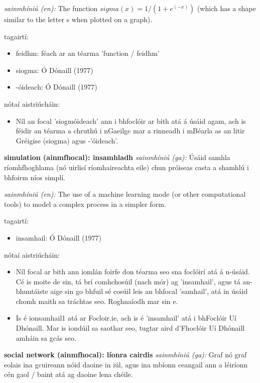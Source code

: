 \documentclass{article}
\begin{document}
\textit{sainmhíniú (en):} The function $sigma(x) = 1 / (1 + e^(-x))$ (which has a shape similar to the letter s when plotted on a graph).

tagairtí:
\begin{itemize}
	\item feidhm: féach ar an téarma 'function / feidhm'
	\item siogma: Ó Dónaill (1977) \cite{odonaill}
	\item -óideach: Ó Dónaill (1977) \cite{odonaill}
\end{itemize}

nótaí aistriúcháin:
\begin{itemize}
	\item Níl an focal 'siogmóideach' ann i bhfoclóir ar bith atá á úsáid agam, ach is féidir an téarma a chruthú i nGaeilge mar a rinneadh i mBéarla as an litir Gréigise (siogma) agus -'óideach'.
\end{itemize}


\textbf{simulation (ainmfhocal): insamhladh}
\textit{sainmhíniú (ga):} Úsáid samhla ríomhfhoghlama (nó uirlisí ríomhaireachta eile) chun próiseas casta a shamhlú i bhfoirm níos simplí.

\textit{sainmhíniú (en):} The use of a machine learning mode (or other computational tools) to model a complex process in a simpler form.

tagairtí:
\begin{itemize}
	\item insamhail: Ó Dónaill (1977) \cite{odonaill}
\end{itemize}

nótaí aistriúcháin:
\begin{itemize}
	\item Níl focal ar bith ann iomlán foirfe don téarma seo sna foclóirí atá á n-úsáid. Cé is moite de sin, tá brí comhchosúil (nach mór) ag 'insamhail', agus tá an-bhuntáiste aige sin go bhfuil sé cosúil leis an bhfocal 'samhail', atá in úsáid chomh maith sa tráchtas seo. Roghnaíodh mar sin e.
	\item Is é ionsamhail1 atá ar Focloir.ie, ach is é 'insamhail' atá i bhFoclóir Uí Dhónaill. Mar is iondúil sa saothar seo, tugtar aird d'Fhoclóir Uí Dhónaill amháin sa gcás seo.
\end{itemize}


\textbf{social network (ainmfhocal): líonra cairdis}
\textit{sainmhíniú (ga):} Graf nó graf eolais ina gcuireann nóid daoine in iúl, agus ina mbíonn ceangail ann a léiríonn cén gaol / baint atá ag daoine lena chéile.
\end{document}
